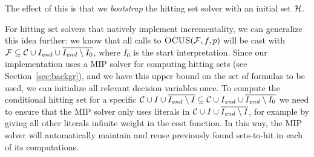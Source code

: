 The effect of this is that we \textit{bootstrap} the hitting set solver with an initial set $\mathcal{H}$.

For hitting set solvers that natively implement incrementality, we can generalize this idea further: we know that all calls to $\textsc{OCUS}(\mathcal{F} ,f,p)$ will be cast with $\mathcal{F}  \subseteq \mathcal{C}\cup I_\mathit{end}  \cup \overline{I_\mathit{end}  \setminus I_0}$, where $I_0$ is the start interpretation. Since our implementation uses a MIP solver for computing hitting sets (see Section~\ref{sec:backgr}), and we have this upper bound on the set of formulas to be used, we can initialize all relevant decision variables once. To compute the conditional hitting set for a specific $\mathcal{C} \cup I\cup \overline{I_\mathit{end} \setminus I} \subseteq \mathcal{C}\cup I_\mathit{end}  \cup \overline{I_\mathit{end}  \setminus I_0}$ we need to ensure that the MIP solver only uses literals in $\mathcal{C} \cup I\cup \overline{I_\mathit{end} \setminus I}$, for example by giving all other literals infinite weight in the cost function. In this way, the MIP solver will automatically maintain and reuse previously found sets-to-hit in each of its computations. 

